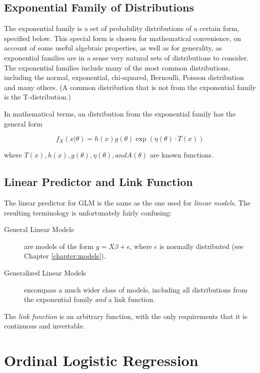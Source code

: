 \subsection{Exponential Family of Distributions}

The exponential family is a set of probability distributions of a certain form, specified below. This special form is chosen for mathematical convenience, on account of some useful algebraic properties, as well as for generality, as exponential families are in a sense very natural sets of distributions to consider. The exponential families include many of the most common distributions, including the normal, exponential, chi-squared, Bernoulli, Poisson distribution and many others. (A common distribution that is not from the exponential family is the T-distribution.)

In mathematical terms, an distribution from the exponential family has the general form

\begin{equation}\label{eq:exponentialFamily}
  f_X(x|\theta) = h(x) g(\theta) \exp \left ( \eta(\theta) \cdot T(x) \right )
\end{equation}

where $T(x), h(x), g(\theta), \eta(\theta), and A(\theta)$ are known functions.

\subsection{Linear Predictor and Link Function}

The linear predictor for GLM is the same as the one used for \emph{linear models}. The resulting terminology is unfortunately fairly confusing:

\begin{description}
  \item[General Linear Models] are models of the form $y=X\beta+ \epsilon$, where $\epsilon$ is normally distributed (see Chapter \ref{chapter:models}).
  \item[Generalized Linear Models] encompass a much wider class of models, including all distributions from the exponential family \emph{and} a link function.
\end{description}

The \emph{link function} is an arbitrary function, with the only requirements that it is continuous and invertable.

\section{Ordinal Logistic Regression}


